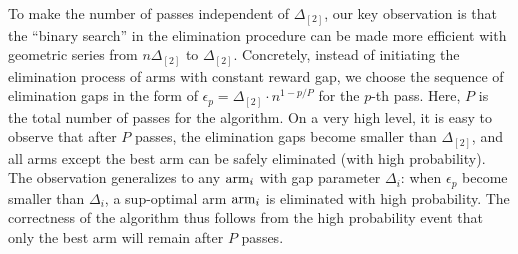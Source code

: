 	To make the number of passes independent of $\Delta_{[2]}$, our key observation is that the ``binary search'' in the elimination procedure can be made more efficient with geometric series from $n\Delta_{[2]}$ to $\Delta_{[2]}$. Concretely, instead of initiating the elimination process of arms with constant reward gap, we choose the sequence of elimination gaps in the form of \(\epsilon_p = {\Delta_{[2]}}\cdot n^{1-p/P}\) for the $p$-th pass. Here, \(P\) is the total number of passes for the algorithm. On a very high level, it is easy to observe that after \(P\) passes, the elimination gaps become smaller than \(\Delta_{[2]}\), and all arms except the best arm can be safely eliminated (with high probability). %
	The observation generalizes to any $\textnormal{arm}_{i}$ with gap parameter \(\Delta_i\): when \(\epsilon_p\) become smaller than \(\Delta_i\), a sup-optimal arm $\textnormal{arm}_{i}$ is eliminated with high probability. The correctness of the algorithm thus follows from the high probability event that only the best arm will remain after \(P\) passes.
	
	
